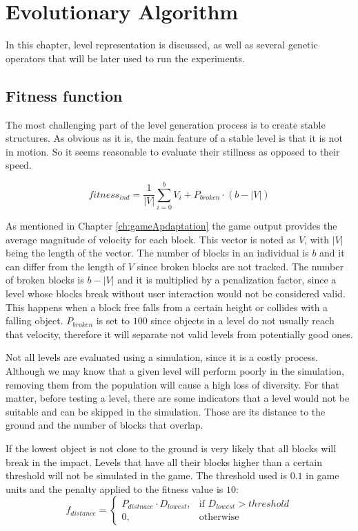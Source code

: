 \chapter{Evolutionary Algorithm}\label{ch:Representation}

In this chapter, level representation is discussed, as well as several genetic operators that will be later used to run the experiments. 

\section{Fitness function}

The most challenging part of the level generation process is to create stable structures. As obvious as it is, the main feature of a stable level is that it is not in motion. So it seems reasonable to evaluate their stillness as opposed to their speed. 

$$fitness_{ind} = \frac{1}{|V|}\sum_{i=0}^{b}{V_i} + P_{broken}\cdot(b-|V|)$$

As mentioned in Chapter \ref{ch:gameApdaptation} the game output provides the average magnitude of velocity for each block. This vector is noted as $V$, with $|V|$ being the length of the vector. The number of blocks in an individual is $b$ and it can differ from the length of $V$ since broken blocks are not tracked. The number of broken blocks is $b-|V|$ and it is multiplied by a penalization factor, since a level whose blocks break without user interaction would not be considered valid. This happens when a block free falls from a certain height or collides with a falling object. $P_{broken}$ is set to $100$ since objects in a level do not usually reach that velocity, therefore it will separate not valid levels from potentially good ones.

Not all levels are evaluated using a simulation, since it is a costly process. Although we may know that a given level will perform poorly in the simulation, removing them from the population will cause a high loss of diversity. For that matter, before testing a level, there are some indicators that a level would not be suitable and can be skipped in the simulation. Those are its distance to the ground and the number of blocks that overlap.

If the lowest object is not close to the ground is very likely that all blocks will break in the impact. Levels that have all their blocks higher than a certain threshold will not be simulated in the game. The threshold used is $0.1$ in game units and the penalty applied to the fitness value is $10$:
$$f_{distance} =
\begin{cases}
P_{distnace}\cdot D_{lowest},& \text{if } D_{lowest} > threshold\\
0,              & \text{otherwise}
\end{cases}
 $$

